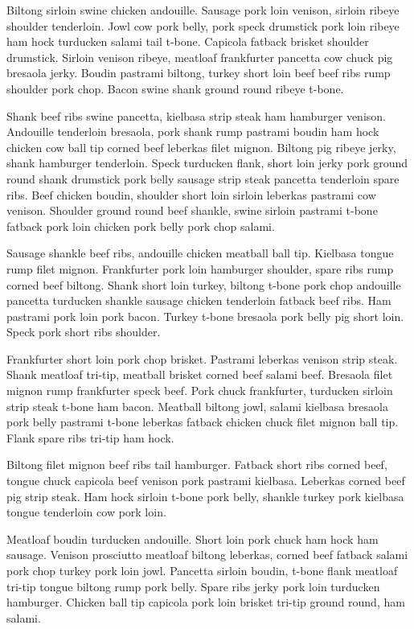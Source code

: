 Biltong sirloin swine chicken andouille. Sausage pork loin venison, sirloin ribeye shoulder tenderloin. Jowl cow pork belly, pork speck drumstick pork loin ribeye ham hock turducken salami tail t-bone. Capicola fatback brisket shoulder drumstick. Sirloin venison ribeye, meatloaf frankfurter pancetta cow chuck pig bresaola jerky. Boudin pastrami biltong, turkey short loin beef beef ribs rump shoulder pork chop. Bacon swine shank ground round ribeye t-bone.

Shank beef ribs swine pancetta, kielbasa strip steak ham hamburger venison. Andouille tenderloin bresaola, pork shank rump pastrami boudin ham hock chicken cow ball tip corned beef leberkas filet mignon. Biltong pig ribeye jerky, shank hamburger tenderloin. Speck turducken flank, short loin jerky pork ground round shank drumstick pork belly sausage strip steak pancetta tenderloin spare ribs. Beef chicken boudin, shoulder short loin sirloin leberkas pastrami cow venison. Shoulder ground round beef shankle, swine sirloin pastrami t-bone fatback pork loin chicken pork belly pork chop salami.

Sausage shankle beef ribs, andouille chicken meatball ball tip. Kielbasa tongue rump filet mignon. Frankfurter pork loin hamburger shoulder, spare ribs rump corned beef biltong. Shank short loin turkey, biltong t-bone pork chop andouille pancetta turducken shankle sausage chicken tenderloin fatback beef ribs. Ham pastrami pork loin pork bacon. Turkey t-bone bresaola pork belly pig short loin. Speck pork short ribs shoulder.

Frankfurter short loin pork chop brisket. Pastrami leberkas venison strip steak. Shank meatloaf tri-tip, meatball brisket corned beef salami beef. Bresaola filet mignon rump frankfurter speck beef. Pork chuck frankfurter, turducken sirloin strip steak t-bone ham bacon. Meatball biltong jowl, salami kielbasa bresaola pork belly pastrami t-bone leberkas fatback chicken chuck filet mignon ball tip. Flank spare ribs tri-tip ham hock.

Biltong filet mignon beef ribs tail hamburger. Fatback short ribs corned beef, tongue chuck capicola beef venison pork pastrami kielbasa. Leberkas corned beef pig strip steak. Ham hock sirloin t-bone pork belly, shankle turkey pork kielbasa tongue tenderloin cow pork loin.

Meatloaf boudin turducken andouille. Short loin pork chuck ham hock ham sausage. Venison prosciutto meatloaf biltong leberkas, corned beef fatback salami pork chop turkey pork loin jowl. Pancetta sirloin boudin, t-bone flank meatloaf tri-tip tongue biltong rump pork belly. Spare ribs jerky pork loin turducken hamburger. Chicken ball tip capicola pork loin brisket tri-tip ground round, ham salami.

